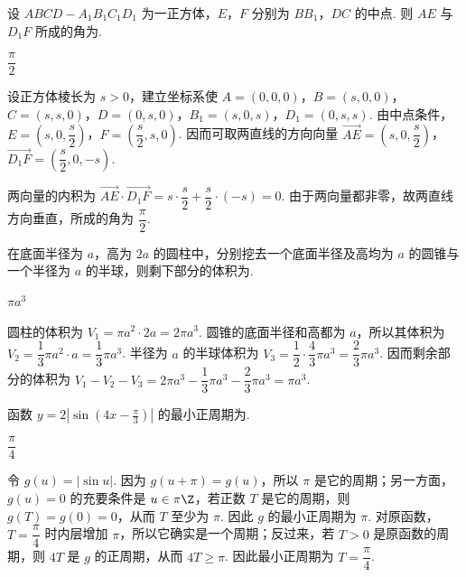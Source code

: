 \begin{problem}
设 \(ABCD-A_1B_1C_1D_1\) 为一正方体，\(E\)，\(F\) 分别为 \(BB_1\)，\(DC\) 的中点. 则 \(AE\) 与 \(D_1F\) 所成的角为\fillinblank{}.
\end{problem}

\begin{answer}
\(\dfrac{\pi}{2}\)
\end{answer}

\begin{solution}
设正方体棱长为 \(s>0\)，建立坐标系使 \(A=(0,0,0)\)，\(B=(s,0,0)\)，\(C=(s,s,0)\)，\(D=(0,s,0)\)，\(B_1=(s,0,s)\)，\(D_1=(0,s,s)\). 由中点条件，\(E=\left(s,0,\dfrac{s}{2}\right)\)，\(F=\left(\dfrac{s}{2},s,0\right)\). 因而可取两直线的方向向量
\(\overrightarrow{AE}=\left(s,0,\dfrac{s}{2}\right)\)，\(\overrightarrow{D_1F}=\left(\dfrac{s}{2},0,-s\right)\).

两向量的内积为 \(\overrightarrow{AE}\cdot\overrightarrow{D_1F}=s\cdot\dfrac{s}{2}+\dfrac{s}{2}\cdot(-s)=0\). 由于两向量都非零，故两直线方向垂直，所成的角为 \(\dfrac{\pi}{2}\).
\end{solution}

\begin{problem}
在底面半径为 \(a\)，高为 \(2a\) 的圆柱中，分别挖去一个底面半径及高均为 \(a\) 的圆锥与一个半径为 \(a\) 的半球，则剩下部分的体积为\fillinblank{}.
\end{problem}

\begin{answer}
\(\pi a^3\)
\end{answer}

\begin{solution}
圆柱的体积为 \(V_1=\pi a^2\cdot2a=2\pi a^3\). 圆锥的底面半径和高都为 \(a\)，所以其体积为 \(V_2=\dfrac13\pi a^2\cdot a=\dfrac13\pi a^3\). 半径为 \(a\) 的半球体积为 \(V_3=\dfrac12\cdot\dfrac43\pi a^3=\dfrac23\pi a^3\). 因而剩余部分的体积为
\(V_1-V_2-V_3=2\pi a^3-\dfrac13\pi a^3-\dfrac23\pi a^3=\pi a^3\).
\end{solution}

\begin{problem}
函数 \(y=2\left|\sin\left(4x-\frac{\pi}{3}\right)\right|\) 的最小正周期为\fillinblank{}.
\end{problem}

\begin{answer}
\(\dfrac{\pi}{4}\)
\end{answer}

\begin{solution}
令 \(g(u)=|\sin u|\). 因为 \(g(u+\pi)=g(u)\)，所以 \(\pi\) 是它的周期；另一方面，\(g(u)=0\) 的充要条件是 \(u\in\pi\Z\)，若正数 \(T\) 是它的周期，则 \(g(T)=g(0)=0\)，从而 \(T\) 至少为 \(\pi\). 因此 \(g\) 的最小正周期为 \(\pi\). 对原函数，\(T=\dfrac{\pi}{4}\) 时内层增加 \(\pi\)，所以它确实是一个周期；反过来，若 \(T>0\) 是原函数的周期，则 \(4T\) 是 \(g\) 的正周期，从而 \(4T\geqslant\pi\). 因此最小正周期为 \(T=\dfrac{\pi}{4}\).
\end{solution}

